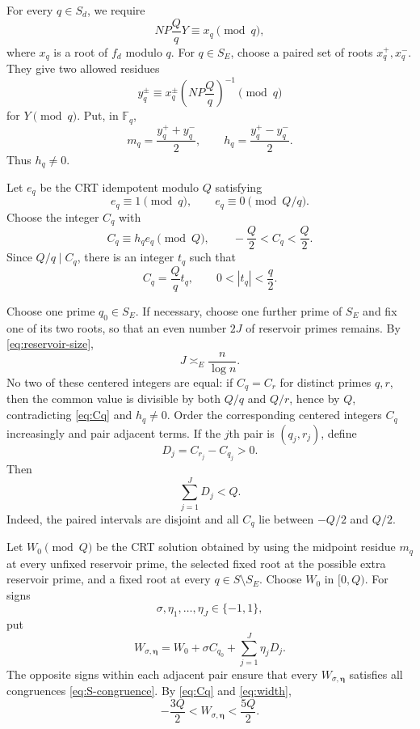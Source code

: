 \documentclass[11pt]{article}
\newcommand{\F}{\mathbb F}
\begin{document}
For every $q\in S_d$, we require
\begin{equation}\label{eq:S-congruence}
  NP\frac QqY\equiv x_q\pmod q,
\end{equation}
where $x_q$ is a root of $f_d$ modulo $q$. For $q\in S_E$, choose a paired set of roots $x_q^+,x_q^-$. They give two allowed residues
\[
  y_q^\pm
  \equiv x_q^\pm\left(NP\frac Qq\right)^{-1}\pmod q
\]
for $Y\pmod q$. Put, in $\F_q$,
\[
  m_q=\frac{y_q^++y_q^-}{2},
  \qquad
  h_q=\frac{y_q^+-y_q^-}{2}.
\]
Thus $h_q\neq0$.

Let $e_q$ be the CRT idempotent modulo $Q$ satisfying
\[
  e_q\equiv1\pmod q,
  \qquad
  e_q\equiv0\pmod{Q/q}.
\]
Choose the integer $C_q$ with
\begin{equation}\label{eq:Cq}
  C_q\equiv h_qe_q\pmod Q,
  \qquad
  -\frac Q2<C_q<\frac Q2.
\end{equation}
Since $Q/q\mid C_q$, there is an integer $t_q$ such that
\begin{equation}\label{eq:tq}
  C_q=\frac Qq t_q,
  \qquad
  0<|t_q|<\frac q2.
\end{equation}

Choose one prime $q_0\in S_E$. If necessary, choose one further prime of $S_E$ and fix one of its two roots, so that an even number $2J$ of reservoir primes remains. By \eqref{eq:reservoir-size},
\begin{equation}\label{eq:J-size}
  J\asymp_E\frac n{\log n}.
\end{equation}
No two of these centered integers are equal: if $C_q=C_r$ for distinct primes $q,r$, then the common value is divisible by both $Q/q$ and $Q/r$, hence by $Q$, contradicting \eqref{eq:Cq} and $h_q\neq0$. Order the corresponding centered integers $C_q$ increasingly and pair adjacent terms. If the $j$th pair is $(q_j,r_j)$, define
\begin{equation}\label{eq:Dj}
  D_j=C_{r_j}-C_{q_j}>0.
\end{equation}
Then
\begin{equation}\label{eq:width}
  \sum_{j=1}^{J}D_j<Q.
\end{equation}
Indeed, the paired intervals are disjoint and all $C_q$ lie between $-Q/2$ and $Q/2$.

Let $W_0\pmod Q$ be the CRT solution obtained by using the midpoint residue $m_q$ at every unfixed reservoir prime, the selected fixed root at the possible extra reservoir prime, and a fixed root at every $q\in S\setminus S_E$. Choose $W_0$ in $[0,Q)$. For signs
\[
  \sigma,\eta_1,\ldots,\eta_J\in\{-1,1\},
\]
put
\begin{equation}\label{eq:W}
  W_{\sigma,\boldsymbol\eta}
  =W_0+\sigma C_{q_0}+\sum_{j=1}^{J}\eta_jD_j.
\end{equation}
The opposite signs within each adjacent pair ensure that every $W_{\sigma,\boldsymbol\eta}$ satisfies all congruences \eqref{eq:S-congruence}. By \eqref{eq:Cq} and \eqref{eq:width},
\begin{equation}\label{eq:W-range}
  -\frac{3Q}{2}<W_{\sigma,\boldsymbol\eta}<\frac{5Q}{2}.
\end{equation}
\end{document}

